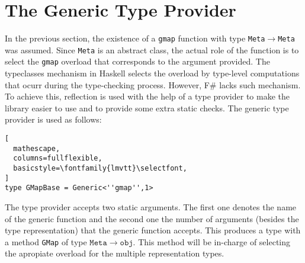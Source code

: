 \documentclass{sigplanconf}
\begin{document}
\section{The Generic Type Provider}
In the previous section, the existence of a \verb+gmap+ function with
type \verb+Meta+$\to$\verb+Meta+ was assumed. Since \verb+Meta+ is an
abstract class, the actual role of the function is to select the
\verb+gmap+ overload that corresponds to the argument provided. The
typeclasses mechanism in Haskell selects the overload by type-level
computations that ocurr during the type-checking process. However, F\#
lacks such mechanism. To achieve this, reflection is used with the
help of a type provider to make the library easier to use and to
provide some extra static checks. The generic type provider is used as
follows:
\begin{lstlisting}[
  mathescape,
  columns=fullflexible,
  basicstyle=\fontfamily{lmvtt}\selectfont,
]
type GMapBase = Generic<''gmap'',1>
\end{lstlisting}
The type provider accepts two static arguments. The first one denotes
the name of the generic function and the second one the number of
arguments (besides the type representation) that the generic function
accepts. This produces a type with a method \verb+GMap+ of type
$\mathtt{Meta} \to \mathtt{obj}$. This method will be in-charge of
selecting the apropiate overload for the multiple representation
types.
\end{document}
